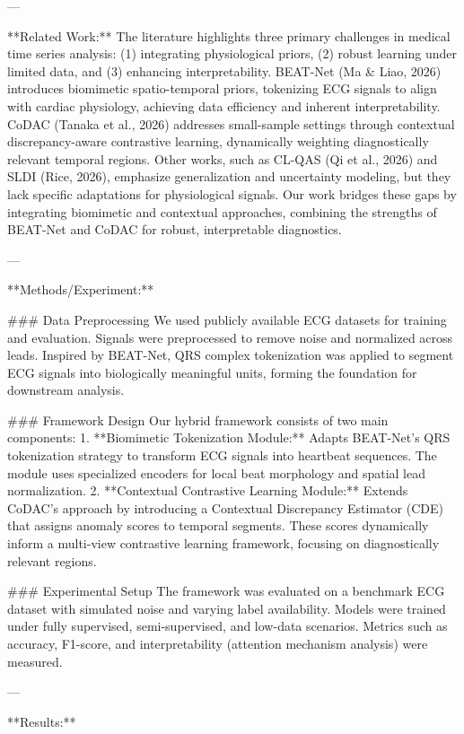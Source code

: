 ---

**Related Work:**  
The literature highlights three primary challenges in medical time series analysis: (1) integrating physiological priors, (2) robust learning under limited data, and (3) enhancing interpretability. BEAT-Net (Ma & Liao, 2026) introduces biomimetic spatio-temporal priors, tokenizing ECG signals to align with cardiac physiology, achieving data efficiency and inherent interpretability. CoDAC (Tanaka et al., 2026) addresses small-sample settings through contextual discrepancy-aware contrastive learning, dynamically weighting diagnostically relevant temporal regions. Other works, such as CL-QAS (Qi et al., 2026) and SLDI (Rice, 2026), emphasize generalization and uncertainty modeling, but they lack specific adaptations for physiological signals. Our work bridges these gaps by integrating biomimetic and contextual approaches, combining the strengths of BEAT-Net and CoDAC for robust, interpretable diagnostics.

---

**Methods/Experiment:**  

### Data Preprocessing  
We used publicly available ECG datasets for training and evaluation. Signals were preprocessed to remove noise and normalized across leads. Inspired by BEAT-Net, QRS complex tokenization was applied to segment ECG signals into biologically meaningful units, forming the foundation for downstream analysis.

### Framework Design  
Our hybrid framework consists of two main components:  
1. **Biomimetic Tokenization Module:** Adapts BEAT-Net's QRS tokenization strategy to transform ECG signals into heartbeat sequences. The module uses specialized encoders for local beat morphology and spatial lead normalization.  
2. **Contextual Contrastive Learning Module:** Extends CoDAC's approach by introducing a Contextual Discrepancy Estimator (CDE) that assigns anomaly scores to temporal segments. These scores dynamically inform a multi-view contrastive learning framework, focusing on diagnostically relevant regions.

### Experimental Setup  
The framework was evaluated on a benchmark ECG dataset with simulated noise and varying label availability. Models were trained under fully supervised, semi-supervised, and low-data scenarios. Metrics such as accuracy, F1-score, and interpretability (attention mechanism analysis) were measured.

---

**Results:**  

